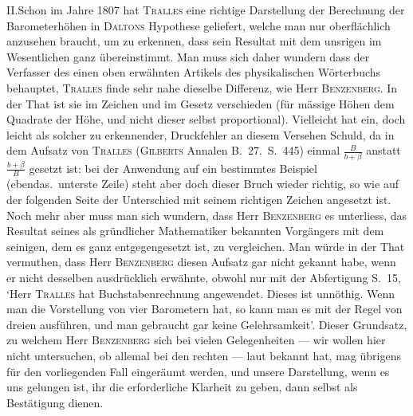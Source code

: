 II.\quad Schon im Jahre 1807 hat \textsc{Tralles} eine richtige Darstellung der Berechnung der Barometerhöhen in \textsc{Daltons} Hypothese geliefert, welche man nur oberflächlich anzusehen braucht, um zu erkennen, dass sein Resultat mit dem unsrigen im Wesentlichen ganz übereinstimmt. Man muss sich daher wundern dass der Verfasser des einen oben erwähnten Artikels des physikalischen Wörterbuchs behauptet, \textsc{Tralles} finde sehr nahe dieselbe Differenz, wie Herr \textsc{Benzenberg}. In der That ist sie im Zeichen und im Gesetz verschieden (für mässige
Höhen dem Quadrate der Höhe, und nicht dieser selbst proportional). Vielleicht hat ein, doch leicht als solcher zu erkennender, Druckfehler an diesem Versehen Schuld, da in dem Aufsatz von \textsc{Tralles} (\textsc{Gilberts} Annalen B.\ 27.\ S.\ 445) einmal $\frac{B}{b+\beta}$ anstatt $\frac{b+\beta}{B}$ gesetzt ist: bei der Anwendung auf ein bestimmtes Beispiel (ebendas.\ unterste Zeile) steht aber doch dieser Bruch wieder richtig, so wie auf der folgenden Seite der Unterschied mit seinem richtigen Zeichen angesetzt ist. Noch mehr aber muss man sich wundern, dass Herr \textsc{Benzenberg} es unterliess, das Resultat seines als gründlicher Mathematiker bekannten Vorgängers mit dem seinigen, dem es ganz entgegengesetzt ist, zu vergleichen. Man würde in der That vermuthen, dass Herr \textsc{Benzenberg} diesen Aufsatz gar nicht gekannt habe, wenn er nicht desselben ausdrücklich erwähnte, obwohl nur mit der Abfertigung S.\ 15, `Herr \textsc{Tralles} hat Buchstabenrechnung angewendet. Dieses ist unnöthig. Wenn man die Vorstellung von vier Barometern hat, so kann man es mit der Regel von dreien ausführen, und man gebraucht gar keine Gelehrsamkeit'. Dieser Grundsatz, zu welchem Herr \textsc{Benzenberg} sich bei vielen Gelegenheiten — wir wollen hier nicht untersuchen, ob allemal bei den rechten — laut bekannt hat, mag übrigens für den vorliegenden Fall eingeräumt werden, und unsere Darstellung, wenn es uns gelungen ist, ihr die erforderliche Klarheit zu geben, dann selbst als Bestätigung dienen.

